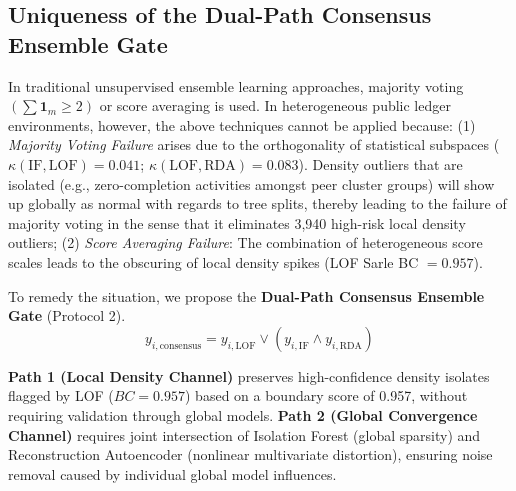 \documentclass[conference]{IEEEtran}
\begin{document}
\subsection{Uniqueness of the Dual-Path Consensus Ensemble Gate}

In traditional unsupervised ensemble learning approaches, majority voting $\left(\sum \mathbf{1}_{m} \geq 2\right)$ or score averaging is used. In heterogeneous public ledger environments, however, the above techniques cannot be applied because: (1) \textit{Majority Voting Failure} arises due to the orthogonality of statistical subspaces ($\kappa(\text{IF}, \text{LOF}) = 0.041$; $\kappa(\text{LOF}, \text{RDA}) = 0.083$). Density outliers that are isolated (e.g., zero-completion activities amongst peer cluster groups) will show up globally as normal with regards to tree splits, thereby leading to the failure of majority voting in the sense that it eliminates 3,940 high-risk local density outliers; (2) \textit{Score Averaging Failure}: The combination of heterogeneous score scales leads to the obscuring of local density spikes (LOF Sarle BC $=0.957$).

To remedy the situation, we propose the \textbf{Dual-Path Consensus Ensemble Gate} (Protocol 2).
\begin{equation}
y_{i, \mathrm{consensus}} = y_{i, \mathrm{LOF}} \lor \left(y_{i, \mathrm{IF}} \land y_{i, \mathrm{RDA}}\right)
\end{equation}

\textbf{Path 1 (Local Density Channel)} preserves high-confidence density isolates flagged by LOF ($BC=0.957$) based on a boundary score of 0.957, without requiring validation through global models. \textbf{Path 2 (Global Convergence Channel)} requires joint intersection of Isolation Forest (global sparsity) and Reconstruction Autoencoder (nonlinear multivariate distortion), ensuring noise removal caused by individual global model influences.
\end{document}
